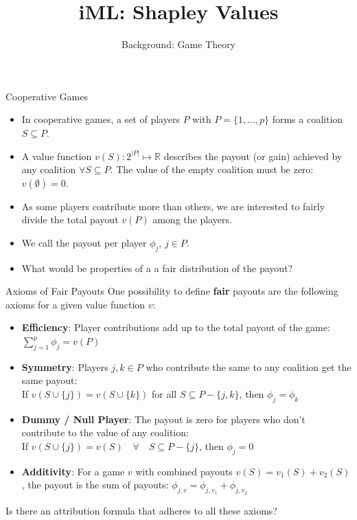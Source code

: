 \documentclass[aspectratio=169]{../latex_main/tntbeamer}  %
\title[Introduction]{iML: Shapley Values}
\subtitle{Background: Game Theory}
\begin{document}
	
	\maketitle
	
\begin{frame}{Cooperative Games}
\begin{itemize}
  \item In cooperative games, a set of players $P$ with $P = \{1, \hdots, p\}$ forms a coalition $S \subseteq P$. 
  \item A value function $v(S): 2^{|P|}\mapsto \mathbb{R}$ describes the payout (or gain) achieved by any coalition $\forall S \subseteq P$. The value of the empty coalition must be zero: $v(\emptyset) = 0$.
  \item As some players contribute more than others, we are interested to fairly divide the total payout $v(P)$ among the players.
  \item We call the payout per player $\phi_j$, $j \in P$.
  \item What would be properties of a a fair distribution of the payout?
\end{itemize}
\end{frame}


\begin{frame}{Axioms of Fair Payouts}
  One possibility to define \textbf{fair} payouts are the following axioms for a given value function $v$:
  \begin{itemize}
    \item \textbf{Efficiency}: Player contributions add up to the total payout of the game:
      $\sum\nolimits_{j=1}^p\phi_j = v(P)$
    \pause
    \item \textbf{Symmetry}: Players $j,k \in P$ who contribute the same to any coalition get the same payout: \\
      If $v(S \cup \{j\}) = v(S \cup \{k\})$ for all $S \subseteq P - \{j,k\}$, then $\phi_j=\phi_k$
    \pause
    \item \textbf{Dummy / Null Player}: The payout is zero for players who don't contribute to the value of any coalition: \\
      If $v(S \cup \{j\})=v(S)\quad  \forall \quad S \subseteq P - \{j\}$, then $\phi_j=0$
    \pause
    \item \textbf{Additivity}: For a game $v$ with combined payouts $v(S) = v_1(S) + v_2(S)$, the payout is the sum of payouts: $\phi_{j,v} = \phi_{j,v_1} + \phi_{j, v_2}$
  \end{itemize}

  \pause
  Is there an attribution formula that adheres to all these axioms?

\end{frame}
\end{document}
